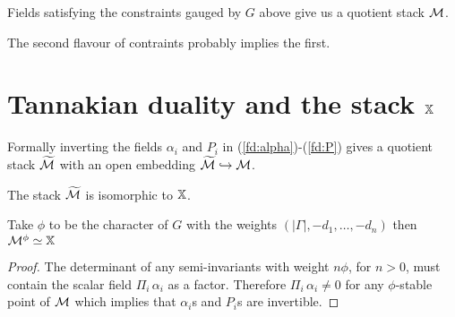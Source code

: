 \documentclass{amsart}
\theoremstyle{definition}
\begin{document}

\begin{definition}
Fields satisfying the constraints gauged by $G$ above give us a quotient stack $\mathcal{M}$.
\end{definition}

\begin{remark}
The second flavour of contraints probably implies the first.
\end{remark}

\section{Tannakian duality and the stack $\mathbb{X}$}

Formally inverting the fields $\alpha_i$ and $P_i$ in (\ref{fd:alpha})-(\ref{fd:P}) gives a quotient stack $\widetilde{\mathcal{M}}$ with an open embedding $\widetilde{\mathcal{M}} \hookrightarrow \mathcal{M}$.

\begin{proposition}\label{prop:tannaka}
The stack $\widetilde{\mathcal{M}}$ is isomorphic to $\mathbb{X}$.
\end{proposition}

\begin{corollary}
Take $\phi$ to be the character of $G$ with the weights $(|\Gamma|, -d_1,\ldots, -d_n)$ then $\mathcal{M}^\phi \simeq \mathbb{X}$
\end{corollary}

\begin{proof}
The determinant of any semi-invariants with weight $n \phi$, for $n>0$, must contain the scalar field $\Pi_i \, \alpha_i$ as a factor.
Therefore $\Pi_i \, \alpha_i \neq 0$ for any $\phi$-stable point of $\mathcal{M}$ which implies that $\alpha_i$s and $P_i$s are invertible.
\end{proof}
\end{document}
